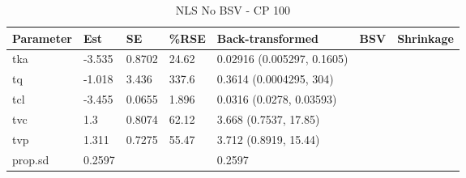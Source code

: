 \begin{table}
\centering\centering
\caption{NLS No BSV - CP 100}
\centering
\fontsize{8}{10}\selectfont
\begin{tabular}[t]{lllllll}
\toprule
\textbf{Parameter} & \textbf{Est} & \textbf{SE} & \textbf{\%RSE} & \textbf{Back-transformed} & \textbf{BSV} & \textbf{Shrinkage}\\
\midrule
tka & -3.535 & 0.8702 & 24.62 & 0.02916 (0.005297, 0.1605) &  & \\
\midrule
tq & -1.018 & 3.436 & 337.6 & 0.3614 (0.0004295, 304) &  & \\
\midrule
tcl & -3.455 & 0.0655 & 1.896 & 0.0316 (0.0278, 0.03593) &  & \\
\midrule
tvc & 1.3 & 0.8074 & 62.12 & 3.668 (0.7537, 17.85) &  & \\
\midrule
tvp & 1.311 & 0.7275 & 55.47 & 3.712 (0.8919, 15.44) &  & \\
\midrule
prop.sd & 0.2597 &  &  & 0.2597 &  & \\
\bottomrule
\end{tabular}
\end{table}